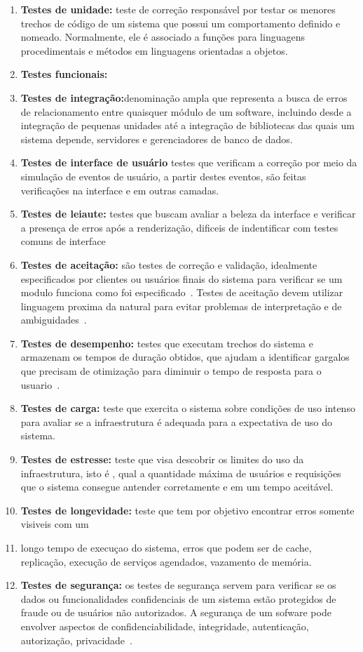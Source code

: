 \begin{enumerate}

\item \textbf{Testes de unidade:} teste de correção responsável por testar os 
menores trechos de código de um sistema que possui um comportamento definido e nomeado.
%
Normalmente, ele é associado a funções para linguagens procedimentais e métodos em 
linguagens orientadas a objetos.
\item \textbf{Testes funcionais:}
\item \textbf{Testes de integração:}denominação ampla que representa a busca de erros 
de relacionamento entre quaisquer módulo de um software, incluindo desde a integração 
de pequenas unidades até a integração de bibliotecas das quais um sistema depende, 
servidores e gerenciadores de banco de dados.
\item \textbf{Testes de interface de usuário} testes que verificam a correção por meio 
da simulação de eventos de usuário, a partir destes eventos, são feitas verificações 
na interface e em outras camadas.
\item \textbf{Testes de leiaute:} testes que buscam avaliar a beleza da interface e 
verificar a presença de erros após a renderização, dificeis de indentificar com testes 
comuns de interface
\item \textbf{Testes de aceitação:} são testes de correção e validação, idealmente 
especificados por clientes ou usuários finais do sistema para verificar se um modulo 
funciona como foi especificado~\cite{martin2005}.
%
Testes de aceitação devem utilizar linguagem proxima da natural para evitar problemas 
de interpretação e de ambiguidades~\cite{cunningham2005}.
\item \textbf{Testes de desempenho:} testes que executam trechos do sistema e armazenam 
os tempos de duração obtidos, que ajudam a identificar gargalos que precisam de otimização 
para diminuir o tempo de resposta  para o usuario~\cite{liu2009}.
\item \textbf{Testes de carga:}  teste que exercita o sistema sobre condições de uso 
intenso para avaliar se a infraestrutura é adequada para a expectativa de uso do sistema.~\cite{avritze1994}
\item \textbf{Testes de estresse:} teste que visa descobrir os limites do uso da infraestrutura, 
isto é , qual a quantidade máxima de usuários e requisições que o sistema consegue antender 
corretamente e em um tempo aceitável.
\item \textbf{Testes de longevidade:} teste que tem por objetivo encontrar erros somente 
visiveis com um\item longo tempo de execuçao do sistema, erros que podem ser de cache, replicação, 
execução de serviços agendados, vazamento de memória.
\item \textbf{Testes de segurança:} os testes de segurança servem para verificar se os 
dados ou funcionalidades confidenciais de um sistema  estão protegidos de fraude ou de 
usuários não autorizados. A segurança de um sofware pode envolver aspectos de confidenciabilidade, 
integridade, autenticação, autorização, privacidade~\cite{whittaker2006}.





\end{enumerate}
